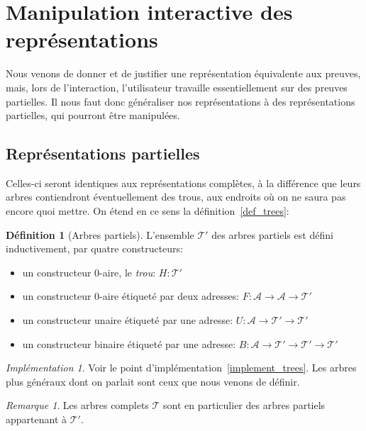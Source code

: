 \documentclass[11pt,a4paper]{article}
\theoremstyle{plain}
\theoremstyle{definition}
\newtheorem{definition}{Définition}
\theoremstyle{remark}
\newtheorem{remark}{Remarque}
\newtheorem{implementation}{Implémentation}
\newcommand*{\trees}{\ensuremath{\mathcal{T}}}
\newcommand*{\treespartial}{\ensuremath{\mathcal{T'}}}
\newcommand*{\unknown}{H}
\begin{document}
\section{Manipulation interactive des représentations}
Nous venons de donner et de justifier une représentation équivalente aux preuves, mais, lors de l'interaction, l'utilisateur travaille essentiellement sur des preuves partielles. Il nous faut donc généraliser nos représentations à des représentations partielles, qui pourront être manipulées.

\subsection{Représentations partielles}
\label{partial_rep}

Celles-ci seront identiques aux représentations complètes, à la différence que leurs arbres contiendront éventuellement des trous, aux endroits où on ne saura pas encore quoi mettre. On étend en ce sens la définition~\ref{def_trees}:

\begin{definition}[Arbres partiels]
    L'ensemble \treespartial{} des arbres partiels est défini inductivement, par quatre constructeurs:
    \begin{itemize}
      \item un constructeur $0$-aire, le \emph{trou}: $\unknown: \treespartial$
      \item un constructeur $0$-aire étiqueté par deux adresses: $F: \mathcal{A} \rightarrow \mathcal{A} \rightarrow \treespartial$
      \item un constructeur unaire étiqueté par une adresse: $U: \mathcal{A} \rightarrow \treespartial \rightarrow \treespartial$
      \item un constructeur binaire étiqueté par une adresse: $B: \mathcal{A} \rightarrow \treespartial \rightarrow \treespartial \rightarrow \treespartial$
    \end{itemize}
\end{definition}

\begin{implementation}
    Voir le point d'implémentation~\ref{implement_trees}. Les arbres plus généraux dont on parlait sont ceux que nous venons de définir.
\end{implementation}

\begin{remark}
    Les arbres complets \trees{} sont en particulier des arbres partiels appartenant à \treespartial{}.
\end{remark}
\end{document}
